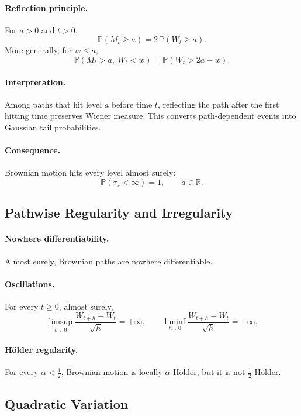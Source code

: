 \documentclass[11pt]{article}
\newcommand{\R}{\mathbb{R}}
\newcommand{\Pbb}{\mathbb{P}}
\newcommand{\1}{\mathbf{1}}
\theoremstyle{plain}
\theoremstyle{definition}
\theoremstyle{remark}
\begin{document}
\paragraph{Reflection principle.}
For $a>0$ and $t>0$,
\[
\Pbb(M_t\ge a)=2\,\Pbb(W_t\ge a).
\]
More generally, for $w\le a$,
\[
\Pbb(M_t>a,\ W_t<w)=\Pbb(W_t>2a-w).
\]

\paragraph{Interpretation.}
Among paths that hit level $a$ before time $t$,
reflecting the path after the first hitting time preserves Wiener measure.
This converts path-dependent events into Gaussian tail probabilities.

\paragraph{Consequence.}
Brownian motion hits every level almost surely:
\[
\Pbb(\tau_a<\infty)=1,
\qquad a\in\R.
\]

\subsection{Pathwise Regularity and Irregularity}

\paragraph{Nowhere differentiability.}
Almost surely, Brownian paths are nowhere differentiable.

\paragraph{Oscillations.}
For every $t\ge0$, almost surely,
\[
\limsup_{h\downarrow0}\frac{W_{t+h}-W_t}{\sqrt{h}}=+\infty,
\qquad
\liminf_{h\downarrow0}\frac{W_{t+h}-W_t}{\sqrt{h}}=-\infty.
\]

\paragraph{Hölder regularity.}
For every $\alpha<\tfrac12$, Brownian motion is locally $\alpha$-Hölder,
but it is not $\tfrac12$-Hölder.

\subsection{Quadratic Variation}
\end{document}
